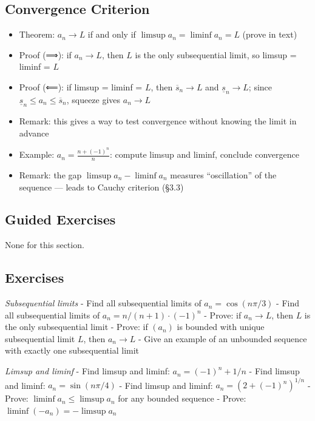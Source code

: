 \documentclass[
  10pt,
  letterpaper,
]{scrbook}
\providecommand{\tightlist}{%
  \setlength{\itemsep}{0pt}\setlength{\parskip}{0pt}}
\begin{document}
\subsection{Convergence Criterion}\label{convergence-criterion}

\begin{itemize}
\tightlist
\item
  Theorem: \(a_n \to L\) if and only if
  \(\limsup a_n = \liminf a_n = L\) (prove in text)
\item
  Proof (⟹): if \(a_n \to L\), then \(L\) is the only subsequential
  limit, so limsup = liminf = \(L\)
\item
  Proof (⟸): if limsup = liminf = \(L\), then \(\overline{s}_n \to L\)
  and \(\underline{s}_n \to L\); since
  \(\underline{s}_n \leq a_n \leq \overline{s}_n\), squeeze gives
  \(a_n \to L\)
\item
  Remark: this gives a way to test convergence without knowing the limit
  in advance
\item
  Example: \(a_n = \frac{n + (-1)^n}{n}\): compute limsup and liminf,
  conclude convergence
\item
  Remark: the gap \(\limsup a_n - \liminf a_n\) measures ``oscillation''
  of the sequence --- leads to Cauchy criterion (§3.3)
\end{itemize}

\subsection{Guided Exercises}\label{guided-exercises-7}

None for this section.

\subsection{Exercises}\label{exercises-12}

\emph{Subsequential limits} - Find all subsequential limits of
\(a_n = \cos(n\pi/3)\) - Find all subsequential limits of
\(a_n = n/(n+1) \cdot (-1)^n\) - Prove: if \(a_n \to L\), then \(L\) is
the only subsequential limit - Prove: if \((a_n)\) is bounded with
unique subsequential limit \(L\), then \(a_n \to L\) - Give an example
of an unbounded sequence with exactly one subsequential limit

\emph{Limsup and liminf} - Find limsup and liminf:
\(a_n = (-1)^n + 1/n\) - Find limsup and liminf: \(a_n = \sin(n\pi/4)\)
- Find limsup and liminf: \(a_n = (2 + (-1)^n)^{1/n}\) - Prove:
\(\liminf a_n \leq \limsup a_n\) for any bounded sequence - Prove:
\(\liminf(-a_n) = -\limsup a_n\)
\end{document}
